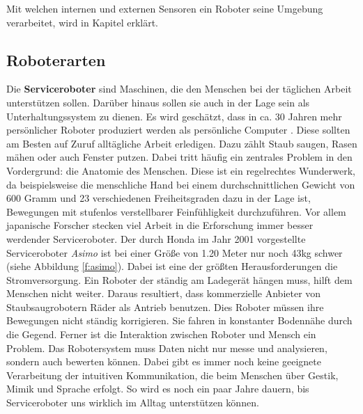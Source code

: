 Mit welchen internen und externen Sensoren ein Roboter seine Umgebung verarbeitet, wird in Kapitel  erklärt.


\subsection{Roboterarten}
Die \textbf{Serviceroboter} sind Maschinen, die den Menschen bei der täglichen Arbeit unterstützen sollen. Darüber hinaus sollen sie auch in der Lage sein als Unterhaltungssystem zu dienen. Es wird geschätzt, dass in ca. 30 Jahren mehr persönlicher Roboter produziert werden als persönliche Computer \cite{Haun2007}.
Diese sollten am Besten auf Zuruf alltägliche Arbeit erledigen. Dazu zählt Staub saugen, Rasen mähen oder auch Fenster putzen. Dabei tritt häufig ein zentrales Problem in den Vordergrund: die Anatomie des Menschen. Diese ist ein regelrechtes Wunderwerk, da beispielsweise die menschliche Hand bei einem durchschnittlichen Gewicht von 600 Gramm und 23 verschiedenen Freiheitsgraden dazu in der Lage ist, Bewegungen mit stufenlos verstellbarer Feinfühligkeit durchzuführen. Vor allem japanische Forscher stecken viel Arbeit in die Erforschung immer besser werdender Serviceroboter. Der durch Honda im Jahr 2001 vorgestellte Serviceroboter \textit{Asimo} ist bei einer Größe von 1.20 Meter nur noch 43kg schwer (siehe Abbildung \ref{f:asimo}).
Dabei ist eine der größten Herausforderungen die Stromversorgung. Ein Roboter der ständig am Ladegerät hängen muss, hilft dem Menschen nicht weiter. Daraus resultiert, dass kommerzielle Anbieter von Staubsaugrobotern Räder als Antrieb benutzen. Dies Roboter müssen ihre Bewegungen nicht ständig korrigieren. Sie fahren in konstanter Bodennähe durch die Gegend. Ferner ist die Interaktion zwischen Roboter und Mensch ein Problem. Das Robotersystem muss Daten nicht nur messe und analysieren, sondern auch bewerten können. Dabei gibt es immer noch keine geeignete Verarbeitung der intuitiven Kommunikation, die beim Menschen über Gestik, Mimik und Sprache erfolgt. So wird es noch ein paar Jahre dauern, bis Serviceroboter uns wirklich im Alltag unterstützen können.
